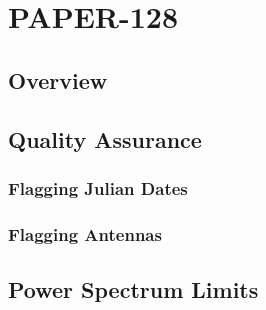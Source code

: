 \chapter{PAPER-128}
\label{c.PSA128}

\section{Overview}
\section{Quality Assurance}
\subsection{Flagging Julian Dates}
\subsection{Flagging Antennas}
\section{Power Spectrum Limits}




